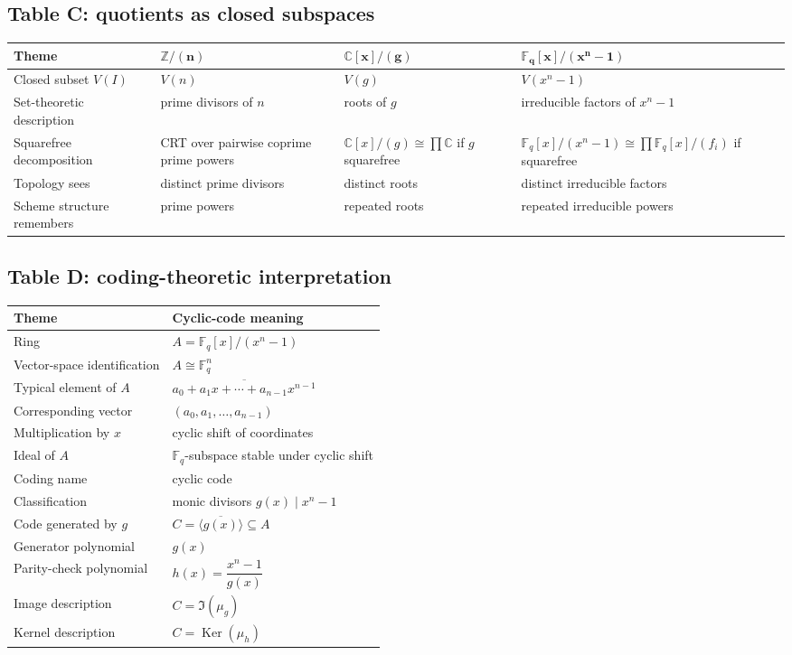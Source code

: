 \documentclass[11pt]{article}
\theoremstyle{definition}
\newcommand{\Z}{\mathbb{Z}}
\newcommand{\C}{\mathbb{C}}
\newcommand{\F}{\mathbb{F}}
\newcommand{\Ker}{\operatorname{Ker}}
\newcommand{\ideal}[1]{\langle #1\rangle}
\newcommand{\ol}[1]{\overline{#1}}
\begin{document}
	\subsection*{Table C: quotients as closed subspaces}
	
	\begin{longtable}{@{}p{}p{}p{}p{}@{}}
		\toprule
		\textbf{Theme} & \(\boldsymbol{\Z/(n)}\) & \(\boldsymbol{\C[x]/(g)}\) & \(\boldsymbol{\F_q[x]/(x^n-1)}\) \\ \midrule
		Closed subset \(V(I)\) & \(V(n)\) & \(V(g)\) & \(V(x^n-1)\) \\
		Set-theoretic description & prime divisors of \(n\) & roots of \(g\) & irreducible factors of \(x^n-1\) \\
		Squarefree decomposition & CRT over pairwise coprime prime powers & \(\C[x]/(g)\cong \prod \C\) if \(g\) squarefree & \(\F_q[x]/(x^n-1)\cong \prod \F_q[x]/(f_i)\) if squarefree \\
		Topology sees & distinct prime divisors & distinct roots & distinct irreducible factors \\
		Scheme structure remembers & prime powers & repeated roots & repeated irreducible powers \\
		\bottomrule
	\end{longtable}
	
	\subsection*{Table D: coding-theoretic interpretation}
	
	\begin{longtable}{@{}p{}p{}@{}}
		\toprule
		\textbf{Theme} & \textbf{Cyclic-code meaning} \\ \midrule
		Ring & \(A=\F_q[x]/(x^n-1)\) \\
		Vector-space identification & \(A\cong \F_q^n\) \\
		Typical element of \(A\) & \(\ol{a_0+a_1x+\cdots+a_{n-1}x^{n-1}}\) \\
		Corresponding vector & \((a_0,a_1,\dots,a_{n-1})\) \\
		Multiplication by \(x\) & cyclic shift of coordinates \\
		Ideal of \(A\) & \(\F_q\)-subspace stable under cyclic shift \\
		Coding name & cyclic code \\
		Classification & monic divisors \(g(x)\mid x^n-1\) \\
		Code generated by \(g\) & \(C=\ideal{\ol{g(x)}}\subseteq A\) \\
		Generator polynomial & \(g(x)\) \\
		Parity-check polynomial & \(h(x)=\dfrac{x^n-1}{g(x)}\) \\
		Image description & \(C=\Im(\mu_g)\) \\
		Kernel description & \(C=\Ker(\mu_h)\) \\
		\bottomrule
	\end{longtable}
	
\end{document}
